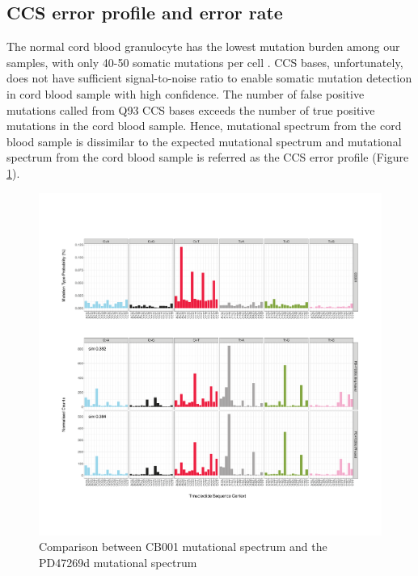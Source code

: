 \subsection{CCS error profile and error rate}

The normal cord blood granulocyte has the lowest mutation burden among our samples, with only 40-50 somatic mutations per cell \cite{Mitchell2022-ry}. CCS bases, unfortunately, does not have sufficient signal-to-noise ratio to enable somatic mutation detection in cord blood sample with high confidence. The number of false positive mutations called from Q93 CCS bases exceeds the number of true positive mutations in the cord blood sample. Hence, mutational spectrum from the cord blood sample is dissimilar to the expected mutational spectrum  and mutational spectrum from the cord blood sample is referred as the CCS error profile (Figure \ref{figure:PD47269d}). 

\begin{figure}[htbp!]
\caption{Comparison between CB001 mutational spectrum and the PD47269d mutational spectrum}
\label{figure:PD47269d}
\includegraphics[width=\textwidth]{Vector/hg19.CB001.PD47269d.pdf}
\end{figure}

